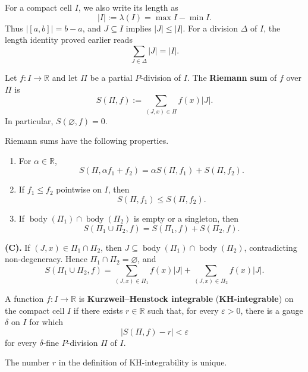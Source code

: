 \begin{notationenv}
For a compact cell $I$, we also write its length as
\[
    |I|:=\lambda(I)=\max I-\min I.
\]
Thus $|[a,b]|=b-a$, and $J\subseteq I$ implies $|J|\le|I|$.
For a division $\Delta$ of $I$, the length identity proved earlier reads
\[
    \sum_{J\in\Delta}|J|=|I|.
\]
\end{notationenv}

\begin{definitionenv}
Let $f:I\to\mathbb R$ and let $\Pi$ be a partial $P$-division of $I$.
The \textbf{Riemann sum} of $f$ over $\Pi$ is
\[
    S(\Pi,f):=\sum_{(J,x)\in\Pi}f(x)|J|.
\]
In particular, $S(\varnothing,f)=0$.
\end{definitionenv}

\begin{propositionenv}
Riemann sums have the following properties.
\begin{enumerate}[label=(\Alph*)]
    \item For $\alpha\in\mathbb R$,
    \[
        S(\Pi,\alpha f_1+f_2)=\alpha S(\Pi,f_1)+S(\Pi,f_2).
    \]
    \item If $f_1\le f_2$ pointwise on $I$, then
    \[
        S(\Pi,f_1)\le S(\Pi,f_2).
    \]
    \item If $\operatorname{body}(\Pi_1)\cap\operatorname{body}(\Pi_2)$
    is empty or a singleton, then
    \[
        S(\Pi_1\cup\Pi_2,f)=S(\Pi_1,f)+S(\Pi_2,f).
    \]
\end{enumerate}
\end{propositionenv}

\begin{proofenv}
\textbf{(C).} If $(J,x)\in\Pi_1\cap\Pi_2$, then
$J\subseteq\operatorname{body}(\Pi_1)\cap\operatorname{body}(\Pi_2)$,
contradicting non-degeneracy. Hence $\Pi_1\cap\Pi_2=\varnothing$, and
\[
    S(\Pi_1\cup\Pi_2,f)
    =\sum_{(J,x)\in\Pi_1}f(x)|J|
     +\sum_{(J,x)\in\Pi_2}f(x)|J|.
\]
\end{proofenv}

\begin{definitionenv}
A function $f:I\to\mathbb R$ is \textbf{Kurzweil--Henstock integrable}
(\textbf{KH-integrable}) on the compact cell $I$ if there exists
$r\in\mathbb R$ such that, for every $\varepsilon>0$, there is a gauge
$\delta$ on $I$ for which
\[
    |S(\Pi,f)-r|<\varepsilon
\]
for every $\delta$-fine $P$-division $\Pi$ of $I$.
\end{definitionenv}

\begin{lemmaenv}
The number $r$ in the definition of KH-integrability is unique.
\end{lemmaenv}

